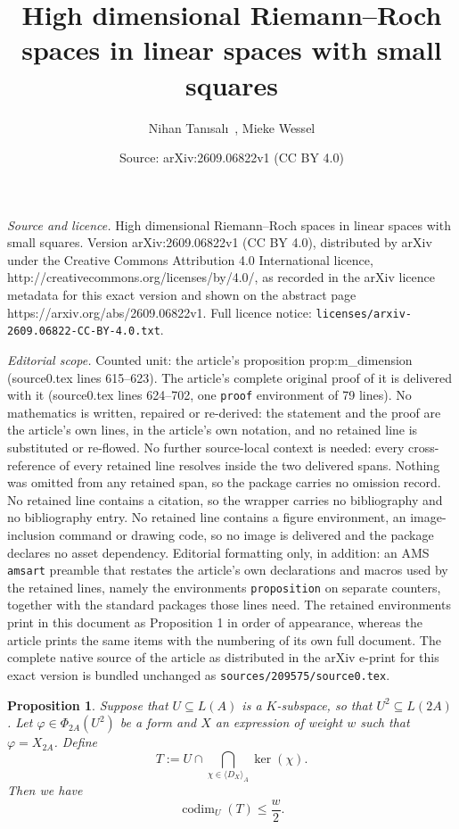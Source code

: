 \documentclass[10pt,a4paper]{amsart}
\title{High dimensional Riemann--Roch spaces in linear spaces with small squares}
\author{Nihan Tan\i sal\i~, Mieke Wessel}
\date{Source: arXiv:2609.06822v1 (CC BY 4.0)}
\newtheorem{proposition}{Proposition}
\newcommand{\divi}[1]{\langle #1 \rangle}
\begin{document}
\maketitle

\noindent\emph{Source and licence.} High dimensional Riemann--Roch spaces in linear spaces with small squares. Version arXiv:2609.06822v1 (CC BY 4.0), distributed by arXiv under the Creative Commons Attribution 4.0 International licence, http://creativecommons.org/licenses/by/4.0/, as recorded in the arXiv licence metadata for this exact version and shown on the abstract page https://arxiv.org/abs/2609.06822v1. Full licence notice: \texttt{licenses/arxiv-2609.06822-CC-BY-4.0.txt}.\par\smallskip

\noindent\textit{Editorial scope.} Counted unit: the article's proposition prop:m\_dimension (source0.tex lines 615--623). The article's complete original proof of it is delivered with it (source0.tex lines 624--702, one \texttt{proof} environment of 79 lines). No mathematics is written, repaired or re-derived: the statement and the proof are the article's own lines, in the article's own notation, and no retained line is substituted or re-flowed.  No further source-local context is needed: every cross-reference of every retained line resolves inside the two delivered spans.  Nothing was omitted from any retained span, so the package carries no omission record.  No retained line contains a citation, so the wrapper carries no bibliography and no bibliography entry.  No retained line contains a figure environment, an image-inclusion command or drawing code, so no image is delivered and the package declares no asset dependency.  Editorial formatting only, in addition: an AMS \texttt{amsart} preamble that restates the article's own declarations and macros used by the retained lines, namely the environments \texttt{proposition} on separate counters, together with the standard packages those lines need.  The retained environments print in this document as Proposition 1 in order of appearance, whereas the article prints the same items with the numbering of its own full document.  The complete native source of the article as distributed in the arXiv e-print for this exact version is bundled unchanged as \texttt{sources/209575/source0.tex}.
	\begin{proposition}\label{prop:m_dimension}
		Suppose that $U \subseteq L(A)$ is a $K$-subspace, so that
		$U^2 \subseteq L(2A)$.
		Let $\varphi \in \Phi_{2A }(U^2)$ be a form and $X$ an expression of weight $w$ such that $\varphi= X_{2A}$.
		Define
		$$T:=U\cap\bigcap_{\chi\in \divi{D_X} _A}\ker(\chi).$$
		Then we have
		$$\operatorname{codim}_U(T) \le \frac{w}{2}.$$
	\end{proposition}
\end{document}
